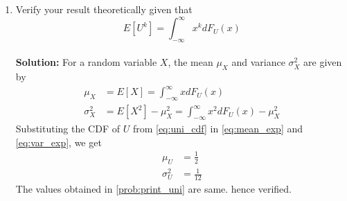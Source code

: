 \documentclass[journal,8pt,onecolumn]{IEEEtran}
\providecommand{\sbrak}[1]{\ensuremath{{}\left[#1\right]}}
\newcommand{\solution}{\noindent \textbf{Solution: }}
\begin{document}
\begin{enumerate}
\item Verify your result theoretically given that
%
\begin{equation}
E\sbrak{U^k} = \int_{-\infty}^{\infty}x^kdF_{U}(x)
\end{equation}\\
\solution For a random variable $X$, the mean $\mu_X$ and variance $\sigma_X^2$ are given by
\begin{align}
	\label{eq:mean_exp}
	\mu_X &= E\sbrak{X} = \int_{-\infty}^{\infty}xdF_{U}(x) \\
	\label{eq:var_exp}
	\sigma_X^2 &= E\sbrak{X^2} - \mu_X^2 = \int_{-\infty}^{\infty}x^2dF_{U}(x) - \mu_X^2
\end{align}  
Substituting the CDF of $U$ from \eqref{eq:uni_cdf} in \eqref{eq:mean_exp} and \eqref{eq:var_exp}, we get
\begin{align}
	\label{eq:mean_uni}
	\mu_U &= \frac{1}{2} \\
	\label{eq:var_uni}
	\sigma_U^2 &= \frac{1}{12}
\end{align}  
The values obtained in \ref{prob:print_uni} are same. hence verified.
\end{enumerate}
\end{document}
